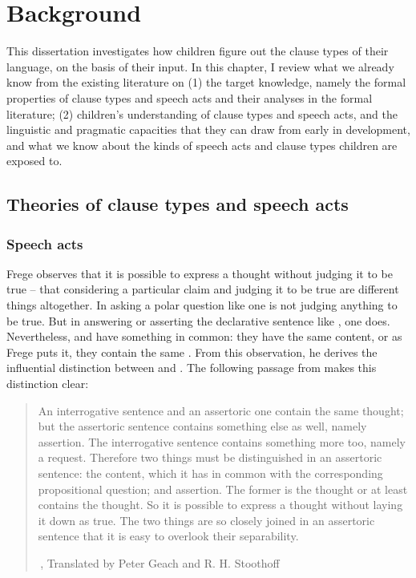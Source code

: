 \chapter{Background}
\label{chap:background}

This dissertation investigates how children figure out the clause types of their language, on the basis of their input. In this chapter, I review what we already know from the existing literature on (1) the target knowledge, namely the formal properties of clause types and speech acts and their analyses in the formal literature; (2) children's understanding of clause types and speech acts, and the linguistic and pragmatic capacities that they can draw from early in development, and what we know about the kinds of speech acts and clause types children are exposed to. 

\section{Theories of clause types and speech acts} \label{sec:bg:theory}


\subsection{Speech acts} \label{sec:bg:theory:speech}

Frege observes that it is possible to express a thought without judging it to be true -- that considering a particular claim and judging it to be true are different things altogether. In asking a polar question like  one is not judging anything to be true. But in answering or asserting the declarative sentence like , one does. Nevertheless,  and  have something in common: they have the same content, or as Frege puts it, they contain the same . From this observation, he derives the influential distinction between  and . The following passage from  makes this distinction clear:

\begin{quote}
    

An interrogative sentence and an assertoric one contain the same thought; but the assertoric sentence contains something else as well, namely assertion. The interrogative sentence contains something more too, namely a request. Therefore two things must be distinguished in an assertoric sentence: the content, which it has in common with the corresponding propositional question; and assertion. The former is the thought or at least contains the thought. So it is possible to express a thought without laying it down as true. The two things are so closely joined in an assertoric sentence that it is easy to overlook their separability. 

$\,$\hfill \cite[62]{frege1918thought}, Translated by Peter Geach and R. H. Stoothoff
\end{quote}

